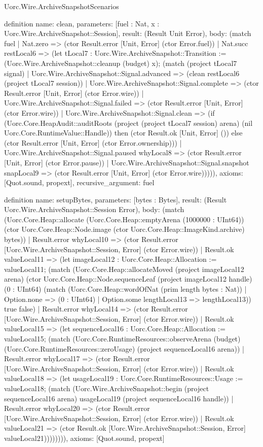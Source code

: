 \begin{lexlean}{Uorc.Wire.ArchiveSnapshotScenarios}
\begin{semanticmodule}
definition{
  name: clean,
  parameters: [fuel : Nat, x : Uorc.Wire.ArchiveSnapshot::Session],
  result: (Result Unit Error),
  body: (match fuel
    | Nat.zero => (ctor Result.error [Unit, Error] (ctor Error.fuel))
    | Nat.succ restLocal6 => (let tLocal7 : Uorc.Wire.ArchiveSnapshot::Transition := (Uorc.Wire.ArchiveSnapshot::cleanup (budget) x); (match (project tLocal7 signal)
      | Uorc.Wire.ArchiveSnapshot::Signal.advanced => (clean restLocal6 (project tLocal7 session))
      | Uorc.Wire.ArchiveSnapshot::Signal.complete => (ctor Result.error [Unit, Error] (ctor Error.wire))
      | Uorc.Wire.ArchiveSnapshot::Signal.failed => (ctor Result.error [Unit, Error] (ctor Error.wire))
      | Uorc.Wire.ArchiveSnapshot::Signal.clean => (if (Uorc.Core.HeapAudit::auditRoots (project (project tLocal7 session) arena) (nil Uorc.Core.RuntimeValue::Handle)) then (ctor Result.ok [Unit, Error] ()) else (ctor Result.error [Unit, Error] (ctor Error.ownership)))
      | Uorc.Wire.ArchiveSnapshot::Signal.paused whyLocal8 => (ctor Result.error [Unit, Error] (ctor Error.pause))
      | Uorc.Wire.ArchiveSnapshot::Signal.snapshot snapLocal9 => (ctor Result.error [Unit, Error] (ctor Error.wire))))),
  axioms: [Quot.sound, propext],
  recursive_argument: fuel
}

definition{
  name: setupBytes,
  parameters: [bytes : Bytes],
  result: (Result Uorc.Wire.ArchiveSnapshot::Session Error),
  body: (match (Uorc.Core.Heap::allocate (Uorc.Core.Heap::emptyArena (1000000 : UInt64)) (ctor Uorc.Core.Heap::Node.image (ctor Uorc.Core.Heap::ImageKind.archive) bytes))
    | Result.error whyLocal10 => (ctor Result.error [Uorc.Wire.ArchiveSnapshot::Session, Error] (ctor Error.wire))
    | Result.ok valueLocal11 => (let imageLocal12 : Uorc.Core.Heap::Allocation := valueLocal11; (match (Uorc.Core.Heap::allocateMoved (project imageLocal12 arena) (ctor Uorc.Core.Heap::Node.sequenceLeaf (project imageLocal12 handle) (0 : UInt64) (match (Uorc.Core.Heap::wordOfNat (prim length bytes : Nat))
        | Option.none => (0 : UInt64)
        | Option.some lengthLocal13 => lengthLocal13)) true false)
      | Result.error whyLocal14 => (ctor Result.error [Uorc.Wire.ArchiveSnapshot::Session, Error] (ctor Error.wire))
      | Result.ok valueLocal15 => (let sequenceLocal16 : Uorc.Core.Heap::Allocation := valueLocal15; (match (Uorc.Core.RuntimeResources::observeArena (budget) (Uorc.Core.RuntimeResources::zeroUsage) (project sequenceLocal16 arena))
        | Result.error whyLocal17 => (ctor Result.error [Uorc.Wire.ArchiveSnapshot::Session, Error] (ctor Error.wire))
        | Result.ok valueLocal18 => (let usageLocal19 : Uorc.Core.RuntimeResources::Usage := valueLocal18; (match (Uorc.Wire.ArchiveSnapshot::begin (project sequenceLocal16 arena) usageLocal19 (project sequenceLocal16 handle))
          | Result.error whyLocal20 => (ctor Result.error [Uorc.Wire.ArchiveSnapshot::Session, Error] (ctor Error.wire))
          | Result.ok valueLocal21 => (ctor Result.ok [Uorc.Wire.ArchiveSnapshot::Session, Error] valueLocal21)))))))),
  axioms: [Quot.sound, propext]
}


\end{semanticmodule}
\end{lexlean}
